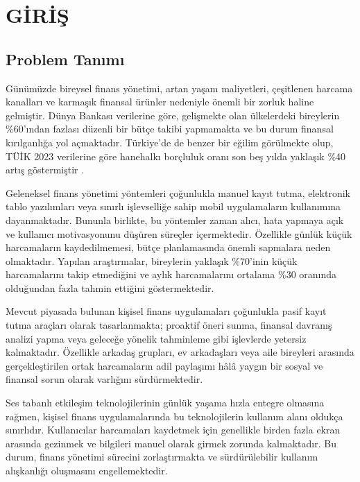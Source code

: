 \chapter{GİRİŞ}

\section{Problem Tanımı}

Günümüzde bireysel finans yönetimi, artan yaşam maliyetleri, çeşitlenen harcama kanalları ve karmaşık finansal ürünler nedeniyle önemli bir zorluk haline gelmiştir. Dünya Bankası verilerine göre, gelişmekte olan ülkelerdeki bireylerin \%60'ından fazlası düzenli bir bütçe takibi yapmamakta ve bu durum finansal kırılganlığa yol açmaktadır. Türkiye'de de benzer bir eğilim görülmekte olup, TÜİK 2023 verilerine göre hanehalkı borçluluk oranı son beş yılda yaklaşık \%40 artış göstermiştir .

Geleneksel finans yönetimi yöntemleri çoğunlukla manuel kayıt tutma, elektronik tablo yazılımları veya sınırlı işlevselliğe sahip mobil uygulamaların kullanımına dayanmaktadır. Bununla birlikte, bu yöntemler zaman alıcı, hata yapmaya açık ve kullanıcı motivasyonunu düşüren süreçler içermektedir. Özellikle günlük küçük harcamaların kaydedilmemesi, bütçe planlamasında önemli sapmalara neden olmaktadır. Yapılan araştırmalar, bireylerin yaklaşık \%70'inin küçük harcamalarını takip etmediğini ve aylık harcamalarını ortalama \%30 oranında olduğundan fazla tahmin ettiğini göstermektedir.

Mevcut piyasada bulunan kişisel finans uygulamaları çoğunlukla pasif kayıt tutma araçları olarak tasarlanmakta; proaktif öneri sunma, finansal davranış analizi yapma veya geleceğe yönelik tahminleme gibi işlevlerde yetersiz kalmaktadır. Özellikle arkadaş grupları, ev arkadaşları veya aile bireyleri arasında gerçekleştirilen ortak harcamaların adil paylaşımı hâlâ yaygın bir sosyal ve finansal sorun olarak varlığını sürdürmektedir.

Ses tabanlı etkileşim teknolojilerinin günlük yaşama hızla entegre olmasına rağmen, kişisel finans uygulamalarında bu teknolojilerin kullanım alanı oldukça sınırlıdır. Kullanıcılar harcamaları kaydetmek için genellikle birden fazla ekran arasında gezinmek ve bilgileri manuel olarak girmek zorunda kalmaktadır. Bu durum, finans yönetimi sürecini zorlaştırmakta ve sürdürülebilir kullanım alışkanlığı oluşmasını engellemektedir.

